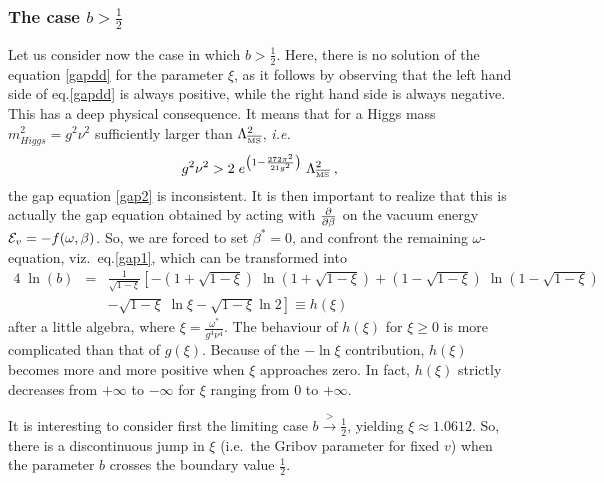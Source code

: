 \subsubsection{The case $b>\frac{1}{2}$}
Let us consider now the case in which $b>\frac{1}{2}$. Here, there is no solution of the equation \eqref{gapdd} for the parameter $\xi$, as it follows by observing that the left hand side of eq.\eqref{gapdd} is always positive, while the right hand side is always negative. This has a deep physical consequence. It means that for a Higgs mass $m_{Higgs}^2 = g^2\nu^2$ sufficiently larger than $\Lambda_{\overline{\mbox{\tiny{MS}}}}^2$, {\it i.e.}
\begin{equation}
g^2 \nu^2 > 2 \; e^{\left( 1 -\frac{272 \pi^2}{21 g^2} \right)} \; \Lambda_{\overline{\mbox{\tiny{MS}}}}^2   \;, \label{mh}
\end{equation}
the gap equation \eqref{gap2} is inconsistent. It is then important to realize that this is actually the gap equation obtained by acting with $\frac{\partial}{\partial \beta}$ on the vacuum energy  ${\cal E}_v= -  f(\omega ,\beta )$.
So, we are forced to set $\beta^*=0$, and confront the remaining $\omega$-equation, viz.~eq.\eqref{gap1},
which can be transformed into
\begin{eqnarray}
4 \; \ln(b) & = &  \frac{1}{\sqrt{1-\xi}} \left[ -\left( 1 +  \sqrt{1-\xi} \right) \; \ln\left( 1 +  \sqrt{1-\xi} \right) +  \left( 1 -  \sqrt{1-\xi} \right) \; \ln\left( 1 - \sqrt{1-\xi} \right) \right.  \nonumber \\
 &\; \;&-\left. \sqrt{1-\xi}\; \ln\xi - \sqrt{1-\xi} \ln 2\right]\equiv h(\xi)
 \label{gapddn}
\end{eqnarray}
after a little algebra, where $\xi=\frac{\omega^*}{g^4\nu^4}$. The behaviour of $h(\xi)$ for $\xi\geq0$ is more complicated than that of $g(\xi)$. Because of the $-\ln\xi$ contribution, $h(\xi)$ becomes more and more positive when $\xi$ approaches zero. In fact, $h(\xi)$ strictly decreases from $+\infty$ to $-\infty$ for $\xi$ ranging from 0 to $+\infty$.

It is interesting to consider first the limiting case $b \stackrel{>}{\to} \frac{1}{2}$, yielding $\xi\approx 1.0612$.   So, there is a discontinuous jump in $\xi$ (i.e.~the Gribov parameter for fixed $v$) when the parameter $b$ crosses the boundary value $\frac{1}{2}$.

